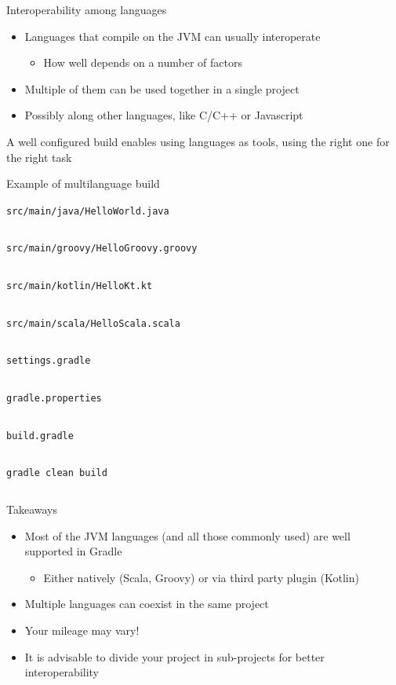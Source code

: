 \documentclass[presentation]{beamer}
\newcommand{\codefile}[4]{
	\begin{block}{\texttt{#2}}
		\inputminted[fontsize=#3,linenos=true,breaklines=true]{#4}{"workspace/#1/#2"}
	\end{block}
}
\newcommand{\java}[3]{\codefile{#1}{#2}{#3}{java}}
\newcommand{\groovy}[3]{\codefile{#1}{#2}{#3}{groovy}}
\newcommand{\kotlin}[3]{\codefile{#1}{#2}{#3}{kotlin}}
\newcommand{\scala}[3]{\codefile{#1}{#2}{#3}{scala}}
\newcommand{\terminal}[3]{\codefile{#1}{#2}{#3}{text}}
\begin{document}
\begin{frame}[fragile]{Interoperability among languages}
    \begin{itemize}
        \item Languages that compile on the JVM can usually interoperate
        \begin{itemize}
            \item How well depends on a number of factors
        \end{itemize}
        \item Multiple of them can be used together in a single project
        \item Possibly along other languages, like C/C++ or Javascript
    \end{itemize}
    A well configured build enables using languages as tools, using the right one for the right task
\end{frame}

\begin{frame}{Example of multilanguage build}
    \java{16-Multilang}{src/main/java/HelloWorld.java}{\normalsize}
    \groovy{16-Multilang}{src/main/groovy/HelloGroovy.groovy}{\normalsize}
    \kotlin{16-Multilang}{src/main/kotlin/HelloKt.kt}{\normalsize}
    \scala{16-Multilang}{src/main/scala/HelloScala.scala}{\normalsize}
    \groovy{16-Multilang}{settings.gradle}{\normalsize}
    \groovy{16-Multilang}{gradle.properties}{\scriptsize}
    \groovy{16-Multilang}{build.gradle}{\tiny}
    \terminal{16-Multilang}{gradle clean build}{\tiny}
    \begin{block}{Takeaways}
        \begin{itemize}
            \item Most of the JVM languages (and all those commonly used) are well supported in Gradle
            \begin{itemize}
                \item Either natively (Scala, Groovy) or via third party plugin (Kotlin)
            \end{itemize}
            \item Multiple languages can coexist in the same project
            \item Your mileage may vary!
            \item It is advisable to divide your project in sub-projects for better interoperability
        \end{itemize}
    \end{block}
\end{frame}
\end{document}
